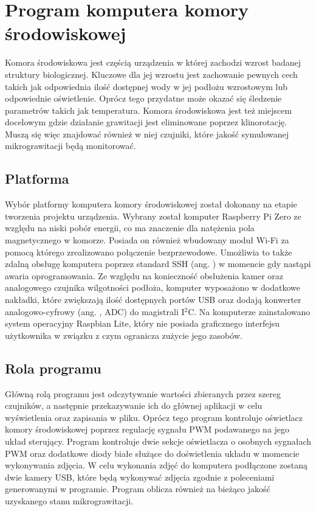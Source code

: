 \graphicspath{{./Komora/images/}}

\chapter{Program komputera komory środowiskowej}

Komora środowiskowa jest częścią urządzenia w której zachodzi wzrost badanej struktury biologicznej. Kluczowe dla jej wzrostu jest zachowanie pewnych cech takich jak odpowiednia ilość dostępnej wody w jej podłożu wzrostowym lub odpowiednie oświetlenie. Oprócz tego przydatne może okazać się śledzenie parametrów takich jak temperatura. Komora środowiskowa jest też miejscem docelowym gdzie działanie grawitacji jest eliminowane poprzez klinorotację. Muszą się więc znajdować również w niej czujniki, które jakość symulowanej mikrograwitacji będą monitorować.

\section{Platforma}

Wybór platformy komputera komory środowiskowej został dokonany na etapie tworzenia projektu urządzenia. Wybrany został komputer Raspberry Pi Zero ze względu na niski pobór energii, co ma znaczenie dla natężenia pola magnetycznego w komorze. Posiada on również wbudowany moduł Wi-Fi za pomocą którego zrealizowano połączenie bezprzewodowe. Umożliwia to także zdalną obsługę komputera poprzez standard SSH (ang. ) w momencie gdy nastąpi awaria oprogramowania. Ze względu na konieczność obsłużenia kamer oraz analogowego czujnika wilgotności podłoża, komputer wyposażono w dodatkowe nakładki, które zwiększają ilość dostępnych portów USB oraz dodają konwerter analogowo-cyfrowy (ang. , ADC) do magistrali I$^2$C. Na komputerze zainstalowano system operacyjny Raspbian Lite, który nie posiada graficznego interfejsu użytkownika w związku z czym ogranicza zużycie jego zasobów.

\section{Rola programu}

Główną rolą programu jest odczytywanie wartości zbieranych przez szereg czujników, a następnie przekazywanie ich do głównej aplikacji w celu wyświetlenia oraz zapisania w pliku. Oprócz tego program kontroluje oświetlacz komory środowiskowej poprzez regulację sygnału PWM podawanego na jego układ sterujący. Program kontroluje dwie sekcje oświetlacza o osobnych sygnałach PWM oraz dodatkowe diody białe służące do doświetlenia układu w momencie wykonywania zdjęcia. W celu wykonania zdjęć do komputera podłączone zostaną dwie kamery USB, które będą wykonywać zdjęcia zgodnie z poleceniami generowanymi w programie. Program oblicza również na bieżąco jakość uzyskanego stanu mikrograwitacji.

